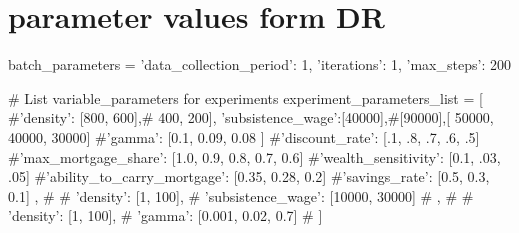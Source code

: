 \section{parameter values form DR}
batch_parameters = {
            'data_collection_period': 1,
            'iterations': 1,
            'max_steps': 200
}

# List variable_parameters for experiments
    experiment_parameters_list = [
         {
            #'density': [800, 600],# 400, 200],
            'subsistence_wage':[40000],#[90000],[ 50000, 40000, 30000]
            #'gamma': [0.1, 0.09, 0.08 ]
            #'discount_rate': [.1, .8, .7, .6, .5]
            #'max_mortgage_share': [1.0, 0.9, 0.8, 0.7, 0.6]
            #'wealth_sensitivity': [0.1, .03, .05]
            #'ability_to_carry_mortgage': [0.35, 0.28, 0.2]
            #'savings_rate': [0.5, 0.3, 0.1]
        },
        # {
        #     'density': [1, 100],
        #     'subsistence_wage': [10000, 30000]
        # },
        # {
        #     'density': [1, 100],
        #     'gamma': [0.001, 0.02, 0.7]
        # }
    ]
    
